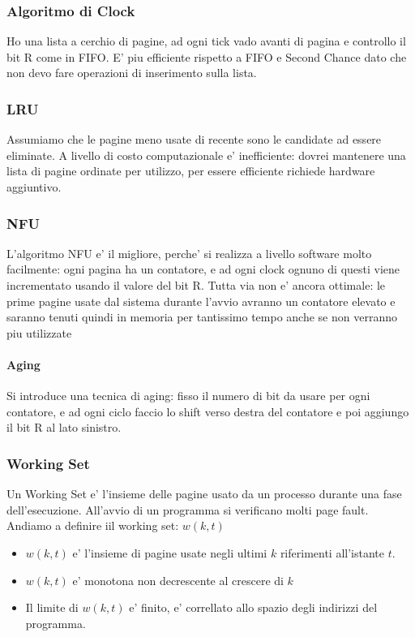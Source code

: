     \subsubsection{Algoritmo di Clock}
        Ho una lista a cerchio di pagine, ad ogni tick vado avanti di pagina e controllo il bit R come in FIFO.
        E' piu efficiente rispetto a FIFO e Second Chance dato che non devo fare operazioni di inserimento sulla lista.

    \subsubsection{LRU}
        Assumiamo che le pagine meno usate di recente sono le candidate ad essere eliminate.
        A livello di costo computazionale e' inefficiente: dovrei mantenere una lista di pagine ordinate per utilizzo,
        per essere efficiente richiede hardware aggiuntivo.
    
    \subsubsection{NFU}
        L'algoritmo NFU e' il migliore, perche' si realizza a livello software molto facilmente:
        ogni pagina ha un contatore, e ad ogni clock ognuno di questi viene incrementato usando il valore del bit R.
        Tutta via non e' ancora ottimale: le prime pagine usate dal sistema durante l'avvio avranno un contatore elevato e saranno tenuti
        quindi in memoria per tantissimo tempo anche se non verranno piu utilizzate

        \paragraph{Aging}
        Si introduce una tecnica di aging: fisso il numero di bit da usare per ogni contatore, e ad ogni ciclo faccio lo shift verso destra
        del contatore e poi aggiungo il bit R al lato sinistro.
        
    \subsubsection{Working Set}
        Un Working Set e' l'insieme delle pagine usato da un processo durante una fase dell'esecuzione.
        All'avvio di un programma si verificano molti page fault.
        Andiamo a definire iil working set: $w(k,t)$
        \begin{itemize}
            \item $w(k,t)$ e' l'insieme di pagine usate negli ultimi $k$ riferimenti all'istante $t$.
            \item $w(k,t)$ e' monotona non decrescente al crescere di $k$
            \item Il limite di $w(k,t)$ e' finito, e' correllato allo spazio degli indirizzi del programma.
        \end{itemize}


